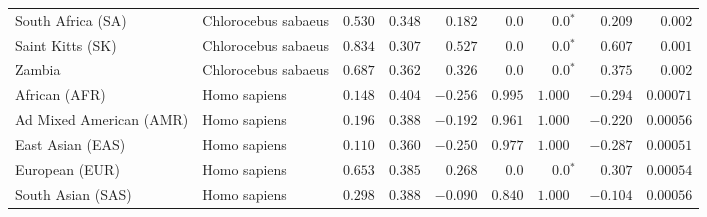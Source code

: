 \begin{center}
\begin{adjustbox}{width = 1\textwidth}
\begin{tabular}{|l|l|r|r|r|r|r|r|r|}
              South Africa (SA) &  Chlorocebus sabaeus &                                        $ 0.530$ &                                           $ 0.348$ &                      $ 0.182$ &            $0.0$ &                  $\bm{0.0{^*}}$ &                                           $ 0.209$ &           $ 0.002$ \\
               Saint Kitts (SK) &  Chlorocebus sabaeus &                                        $ 0.834$ &                                           $ 0.307$ &                      $ 0.527$ &            $0.0$ &                  $\bm{0.0{^*}}$ &                                           $ 0.607$ &           $ 0.001$ \\
                         Zambia &  Chlorocebus sabaeus &                                        $ 0.687$ &                                           $ 0.362$ &                      $ 0.326$ &            $0.0$ &                  $\bm{0.0{^*}}$ &                                           $ 0.375$ &           $ 0.002$ \\
                  African (AFR) &         Homo sapiens &                                        $ 0.148$ &                                           $ 0.404$ &                      $-0.256$ &         $ 0.995$ &                      $ 1.000~~$ &                                           $-0.294$ &          $0.00071$ \\
        Ad Mixed American (AMR) &         Homo sapiens &                                        $ 0.196$ &                                           $ 0.388$ &                      $-0.192$ &         $ 0.961$ &                      $ 1.000~~$ &                                           $-0.220$ &          $0.00056$ \\
               East Asian (EAS) &         Homo sapiens &                                        $ 0.110$ &                                           $ 0.360$ &                      $-0.250$ &         $ 0.977$ &                      $ 1.000~~$ &                                           $-0.287$ &          $0.00051$ \\
                 European (EUR) &         Homo sapiens &                                        $ 0.653$ &                                           $ 0.385$ &                      $ 0.268$ &            $0.0$ &                  $\bm{0.0{^*}}$ &                                           $ 0.307$ &          $0.00054$ \\
              South Asian (SAS) &         Homo sapiens &                                        $ 0.298$ &                                           $ 0.388$ &                      $-0.090$ &         $ 0.840$ &                      $ 1.000~~$ &                                           $-0.104$ &          $0.00056$ \\

\end{tabular}
\end{adjustbox}
\end{center}
